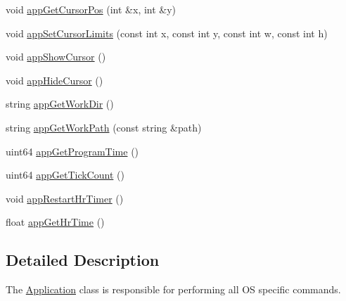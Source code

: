 \begin{DoxyCompactItemize}
\item 
void \hyperlink{class_application_ae8413053cc785729c125b53279d14576}{app\+Get\+Cursor\+Pos} (int \&x, int \&y)
\item 
void \hyperlink{class_application_aec8bf350bbbb3407ed11ebb6b93b7344}{app\+Set\+Cursor\+Limits} (const int x, const int y, const int w, const int h)
\item 
void \hyperlink{class_application_ad0ea87041394ca4c46cd4dbb1011ad84}{app\+Show\+Cursor} ()
\item 
void \hyperlink{class_application_ae4db1227dcce1acae1faf72f92e73467}{app\+Hide\+Cursor} ()
\item 
string \hyperlink{class_application_ac37e92d1ad361e95f9e029949f9aaccd}{app\+Get\+Work\+Dir} ()
\item 
string \hyperlink{class_application_a5847e38189cc6473ef63162c439d7785}{app\+Get\+Work\+Path} (const string \&path)
\item 
uint64 \hyperlink{class_application_a8ed7c9b0cb21e8480e8aef57b142cbed}{app\+Get\+Program\+Time} ()
\item 
uint64 \hyperlink{class_application_a2ae34cff29efc98e9e66b53a345a85f2}{app\+Get\+Tick\+Count} ()
\item 
void \hyperlink{class_application_a1aace92c00cdf019658db7d2e6b69565}{app\+Restart\+Hr\+Timer} ()
\item 
float \hyperlink{class_application_a2502735d4b414fe1d3fa193772e7608a}{app\+Get\+Hr\+Time} ()
\end{DoxyCompactItemize}


\subsection{Detailed Description}
The \hyperlink{class_application}{Application} class is responsible for performing all O\+S specific commands. 

